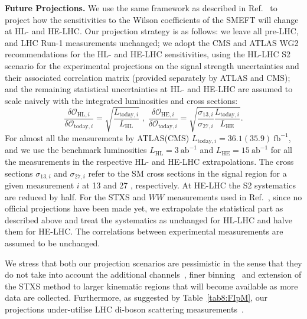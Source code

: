 \documentclass[../report.tex]{subfiles}
\begin{document}
\noindent
{\bf Future Projections.}\label{sec8:proj}
We use the same framework as described in Ref.~\cite{Ellis:2018gqa} to project how the sensitivities to the Wilson coefficients of the SMEFT will change at HL- and HE-LHC. Our projection strategy is as follows:
we leave all pre-LHC, and LHC Run-1 measurements unchanged; we adopt the CMS and ATLAS WG2 recommendations for the HL- and HE-LHC sensitivities, using the HL-LHC S2 scenario for the experimental projections on the signal strength uncertainties and their associated correlation matrix (provided separately by ATLAS and CMS);
and the remaining statistical uncertainties at HL- and HE-LHC are assumed to scale naively with the integrated luminosities and cross sections:
\begin{equation}
\frac{\delta\mathcal{O}_{\text{HL}, i}}{\delta\mathcal{O}_{\text{today}, i}} = \sqrt{\frac{L_{\text{today}, i}}{L_{\text{HL}}}} \; , \;
\frac{\delta\mathcal{O}_{\text{HE}, i}}{\delta\mathcal{O}_{\text{today}, i}} = \sqrt{\frac{\sigma_{13, i}}{\sigma_{27, i}} \frac{L_{\text{today}, i}}{L_{\text{HE}}}}  . \nonumber
\end{equation}
For almost all the measurements by ATLAS(CMS) $L_{\text{today}, i} = 36.1(35.9)~\text{fb}^{-1}$,
and we use the benchmark luminosities $L_{\text{HL}} = 3~\text{ab}^{-1}$ and $L_{\text{HE}} = 15~\text{ab}^{-1}$ for all the measurements in the respective HL- and HE-LHC extrapolations.
The cross sections $\sigma_{13, i}$ and $\sigma_{27, i}$ refer to the SM cross sections in the signal region for a given measurement $i$ at 13 and 27 \UTeV, respectively. At HE-LHC the S2 systematics are reduced by half. For the STXS and $WW$ measurements used in Ref.~\cite{Ellis:2018gqa}, since no official projections have been made yet, we extrapolate the statistical part as described above and treat the systematics as unchanged for HL-LHC and halve them for HE-LHC. The correlations between experimental measurements are assumed to be unchanged.

We stress that both our projection scenarios are pessimistic in the sense that they do not take into account the additional channels~\cite{gilbert:talk}, finer binning~\cite{deFlorian:2016spz, Hays:2290628, ATLAS-CONF-2017-047} and extension of the STXS method to larger kinematic regions that will become available as more data are collected.
Furthermore, as suggested by Table~\ref{tab8:FIpM}, our projections under-utilise LHC di-boson scattering measurements~\cite{Azatov:2017kzw, Franceschini:2017xkh, Dawson:2018dcd}. 
\end{document}
